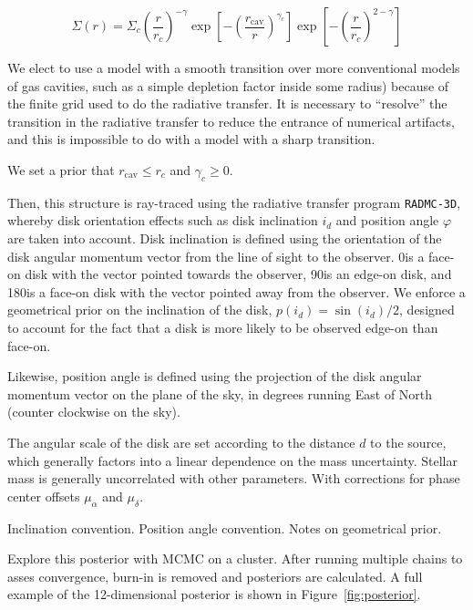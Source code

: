 \documentclass{aastex6}
\begin{document}
\begin{equation}
\Sigma(r) = \Sigma_c \left (\frac{r}{r_c} \right)^{- \gamma} \exp \left [- \left ( \frac{r_\mathrm{cav}}{r} \right)^{\gamma_c} \right ]  \exp \left[ - \left(\frac{r}{r_c} \right)^{2 - \gamma} \right]
\end{equation}

We elect to use a model with a smooth transition over more conventional models of gas cavities, such as a simple depletion factor inside some radius) because of the finite grid used to do the radiative transfer. It is necessary to ``resolve'' the transition in the radiative transfer to reduce the entrance of numerical artifacts, and this is impossible to do with a model with a sharp transition.

We set a prior that $r_\textrm{cav} \leq r_c$ and $\gamma_c \geq 0$.

Then, this structure is ray-traced using the radiative transfer program \texttt{RADMC-3D}, whereby disk orientation effects such as disk inclination $i_d$ and position angle $\varphi$ are taken into account. Disk inclination is defined using the orientation of the disk angular momentum vector from the line of sight to the observer. 0\degr is a face-on disk with the vector pointed towards the observer, 90\degr is an edge-on disk, and 180\degr is a face-on disk with the vector pointed away from the observer. We enforce a geometrical prior on the inclination of the disk, $p(i_d) =  \sin(i_d)/2$, designed to account for the fact that a disk is more likely to be observed edge-on than face-on.

Likewise, position angle is defined using the projection of the disk angular momentum vector on the plane of the sky, in degrees running East of North (counter clockwise on the sky).

The angular scale of the disk are set according to the distance $d$ to the source, which generally factors into a linear dependence on the mass uncertainty. Stellar mass is generally uncorrelated with other parameters. With corrections for phase center offsets $\mu_\alpha$ and $\mu_\delta$.



Inclination convention. Position angle convention. Notes on geometrical prior.

Explore this posterior with MCMC on a cluster. After running multiple chains to asses convergence, burn-in is removed and posteriors are calculated. A full example of the 12-dimensional posterior is shown in Figure~\ref{fig:posterior}.
\end{document}
